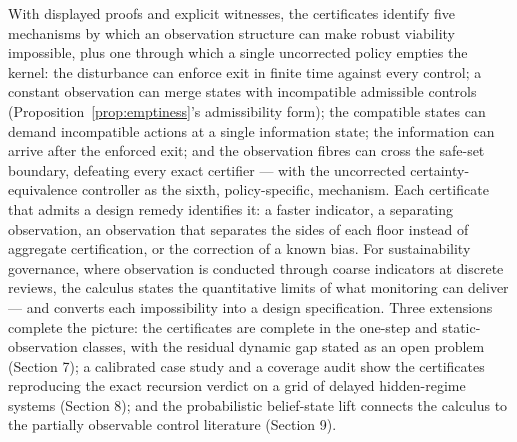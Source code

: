 \documentclass[10pt,twocolumn]{article}
\theoremstyle{definition}
\begin{document}
With displayed proofs and explicit witnesses, the certificates identify
five mechanisms by which an observation structure can make robust
viability impossible, plus one through which a single uncorrected policy
empties the kernel: the disturbance can enforce exit in finite time
against every control; a constant observation can merge states with
incompatible admissible controls (Proposition~\ref{prop:emptiness}'s admissibility form);
the compatible states can demand incompatible actions at a single
information state; the information can arrive after the enforced exit;
and the observation fibres can cross the safe-set boundary, defeating
every exact certifier --- with the uncorrected certainty-equivalence controller as the
sixth, policy-specific, mechanism. Each certificate that admits a design
remedy identifies it: a faster indicator, a separating observation, an
observation that separates the sides of each floor instead of aggregate
certification, or the correction of a known bias. For sustainability
governance, where observation is conducted through coarse indicators at
discrete reviews, the calculus states the quantitative limits of what
monitoring can deliver --- and converts each impossibility into a design
specification. Three extensions complete the picture: the certificates are complete in the one-step and static-observation classes, with the residual dynamic gap stated as an open problem (Section 7); a calibrated case study and a coverage audit show the certificates reproducing the exact recursion verdict on a grid of delayed hidden-regime systems (Section 8); and the probabilistic belief-state lift connects the calculus to the partially observable control literature (Section 9).
\end{document}
